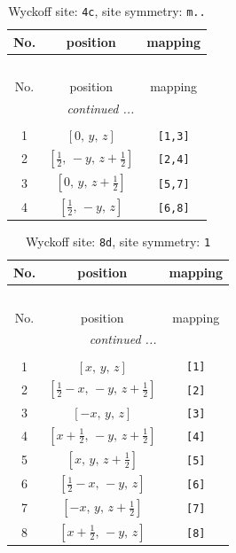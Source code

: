 \documentclass[fleqn,8pt]{jsarticle}
\begin{document}
\renewcommand{\arraystretch}{1.2}
\begin{longtable}{ccc}
\caption{Wyckoff site: {\tt 4c}, site symmetry: {\tt m..}}
 \\
 \hline \hline
No. & position & mapping \\ \hline \endfirsthead

\multicolumn{2}{l}{\tablename\ \thetable{}} \\
 \hline \hline
No. & position & mapping \\ \hline \endhead

 \hline \hline
\multicolumn{2}{r}{\footnotesize\it continued ...} \\ \endfoot

 \hline \hline
\multicolumn{2}{r}{} \\ \endlastfoot

1 & $\left[ 0,\, y,\, z \right]$ & {\tt [1,3]} \\ \hline
2 & $\left[ \frac{1}{2},\, - y,\, z + \frac{1}{2} \right]$ & {\tt [2,4]} \\ \hline
3 & $\left[ 0,\, y,\, z + \frac{1}{2} \right]$ & {\tt [5,7]} \\ \hline
4 & $\left[ \frac{1}{2},\, - y,\, z \right]$ & {\tt [6,8]} \\
\end{longtable}
\renewcommand{\arraystretch}{1.2}
\begin{longtable}{ccc}
\caption{Wyckoff site: {\tt 8d}, site symmetry: {\tt 1}}
 \\
 \hline \hline
No. & position & mapping \\ \hline \endfirsthead

\multicolumn{2}{l}{\tablename\ \thetable{}} \\
 \hline \hline
No. & position & mapping \\ \hline \endhead

 \hline \hline
\multicolumn{2}{r}{\footnotesize\it continued ...} \\ \endfoot

 \hline \hline
\multicolumn{2}{r}{} \\ \endlastfoot

1 & $\left[ x,\, y,\, z \right]$ & {\tt [1]} \\ \hline
2 & $\left[ \frac{1}{2} - x,\, - y,\, z + \frac{1}{2} \right]$ & {\tt [2]} \\ \hline
3 & $\left[ - x,\, y,\, z \right]$ & {\tt [3]} \\ \hline
4 & $\left[ x + \frac{1}{2},\, - y,\, z + \frac{1}{2} \right]$ & {\tt [4]} \\ \hline
5 & $\left[ x,\, y,\, z + \frac{1}{2} \right]$ & {\tt [5]} \\ \hline
6 & $\left[ \frac{1}{2} - x,\, - y,\, z \right]$ & {\tt [6]} \\ \hline
7 & $\left[ - x,\, y,\, z + \frac{1}{2} \right]$ & {\tt [7]} \\ \hline
8 & $\left[ x + \frac{1}{2},\, - y,\, z \right]$ & {\tt [8]} \\
\end{longtable}
\end{document}
